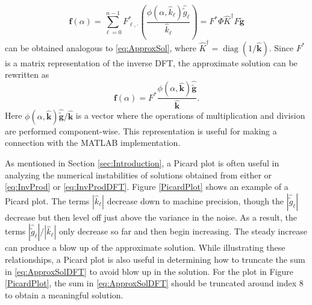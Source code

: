 \documentclass[12pt]{article}
\newcommand{\gnoise}{\widetilde{g}}	%
\newcommand{\gnoiseVec}{\widetilde{\mathbf{g}}}	%
\newcommand{\kVec}{\mathbf{k}}	%
\newcommand{\kMat}{K}	%
\newcommand{\fVec}{\mathbf{f}}	%
\newcommand{\ctrans}{*}	%
\newcommand{\diag}{\operatorname{diag}}	%
\newcommand{\regparam}{\alpha}
\newcommand{\filt}{\phi}
\begin{document}
\begin{equation}
\fVec(\regparam) = \sum_{\ell = 0}^{n-1} F^\ctrans_{\ell,\cdot}\left(\frac{\filt(\regparam,\widehat{k}_\ell)\widehat{\gnoise}_\ell}{\widehat{k}_\ell}\right) = F^\ctrans\Phi\widehat{\kMat}^\dagger F\gnoiseVec
\label{eq:ApproxSolDFT}
\end{equation}
can be obtained analogous to \eqref{eq:ApproxSol}, where $\widehat{\kMat}^\dagger = \diag(1/\widehat{\kVec})$.
Since $F^\ctrans$ is a matrix representation of the inverse DFT, the approximate solution can be rewritten as
\[\fVec(\regparam) = F^\ctrans \frac{\filt(\regparam,\widehat{\kVec})\widehat{\gnoiseVec}}{\widehat{\kVec}}.\]
Here $\filt(\regparam,\widehat{\kVec})\widehat{\gnoiseVec}/{\widehat{\kVec}}$ is a vector where the operations of multiplication and division are performed component-wise. This representation is useful for making a connection with the MATLAB implementation. \par
As mentioned in Section \ref{sec:Introduction}, a Picard plot is often useful in analyzing the numerical instabilities of solutions obtained from either or \eqref{eq:InvProd} or \eqref{eq:InvProdDFT}. Figure \ref{PicardPlot} shows an example of a Picard plot. The terms $|\widehat{k}_\ell|$ decrease down to machine precision, though the $|\widehat{\gnoise}_\ell|$ decrease but then level off just above the variance in the noise. As a result, the terms $|\widehat{\gnoise}_\ell|/|\widehat{k}_\ell|$ only decrease so far and then begin increasing. The steady increase can produce a blow up of the approximate solution. While illustrating these relationships, a Picard plot is also useful in determining how to truncate the sum in \eqref{eq:ApproxSolDFT} to avoid blow up in the solution. For the plot in Figure \ref{PicardPlot}, the sum in \eqref{eq:ApproxSolDFT} should be truncated around index 8 to obtain a meaningful solution. \par 
\end{document}
